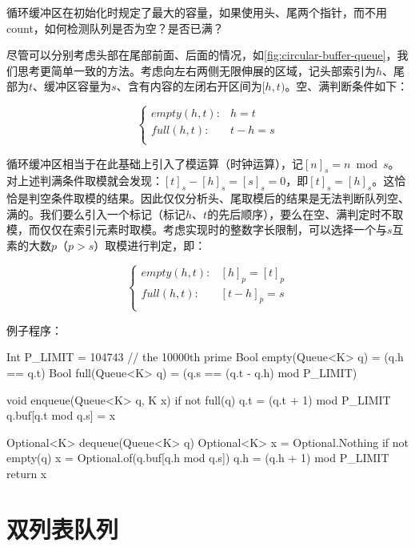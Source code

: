 \documentclass[b5paper]{ctexart}
\begin{document}
\begin{Answer}[ref = {ex:buffered-queue}]
循环缓冲区在初始化时规定了最大的容量，如果使用头、尾两个指针，而不用count，如何检测队列是否为空？是否已满？

\vspace{3mm}
尽管可以分别考虑头部在尾部前面、后面的情况，如\cref{fig:circular-buffer-queue}，我们思考更简单一致的方法。考虑向左右两侧无限伸展的区域，记头部索引为$h$、尾部为$t$、缓冲区容量为$s$、含有内容的左闭右开区间为$[h, t)$。空、满判断条件如下：

\[
\begin{cases}
empty(h, t): & h = t  \\
full(h, t): & t - h = s \\
\end{cases}
\]

循环缓冲区相当于在此基础上引入了模运算（时钟运算），记$[n]_s = n \bmod s$。对上述判满条件取模就会发现：$[t]_s - [h]_s = [s]_s = 0$，即$[t]_s = [h]_s$。这恰恰是判空条件取模的结果。因此仅仅分析头、尾取模后的结果是无法判断队列空、满的。我们要么引入一个标记（标记$h$、$t$的先后顺序），要么在空、满判定时不取模，而仅仅在索引元素时取模。考虑实现时的整数字长限制，可以选择一个与$s$互素的大数$p$（$p > s$）取模进行判定，即：

\[
\begin{cases}
empty(h, t): & [h]_p = [t]_p  \\
full(h, t): & [t - h]_p = s \\
\end{cases}
\]

例子程序：

\begin{Bourbaki}
Int P_LIMIT = 104743 // the 10000th prime
Bool empty(Queue<K> q) = (q.h == q.t)
Bool full(Queue<K> q) = (q.s == (q.t - q.h) mod P_LIMIT)

void enqueue(Queue<K> q, K x) {
    if not full(q) {
        q.t = (q.t + 1) mod P_LIMIT
        q.buf[q.t mod q.s] = x
    }
}

Optional<K> dequeue(Queue<K> q) {
    Optional<K> x = Optional.Nothing
    if not empty(q) {
        x = Optional.of(q.buf[q.h mod q.s])
        q.h = (q.h + 1) mod P_LIMIT
    }
    return x
}
\end{Bourbaki}
\end{Answer}

\section{双列表队列}
\end{document}

